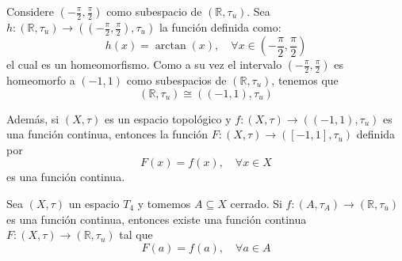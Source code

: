 \documentclass[12pt]{report}
\theoremstyle{largebreak}
\newcommand\cf[3]{\ensuremath{#1:#2\rightarrow#3}}
\begin{document}
    \begin{obs}
        Considere $\left(-\frac{\pi}{2},\frac{\pi}{2}\right)$ como subespacio de $(\mathbb{R},\tau_u)$. Sea $\cf{h}{(\mathbb{R},\tau_u)}{\left(\left(-\frac{\pi}{2},\frac{\pi}{2}\right),\tau_u\right)}$ la función definida como:
        \begin{equation*}
            h(x)=\arctan(x),\quad\forall x\in\left(-\frac{\pi}{2},\frac{\pi}{2}\right)
        \end{equation*}
        el cual es un homeomorfismo. Como a su vez el intervalo $\left(-\frac{\pi}{2},\frac{\pi}{2}\right)$ es homeomorfo a $(-1,1)$ como subespacios de $(\mathbb{R},\tau_u)$, tenemos que
        \begin{equation*}
            (\mathbb{R},\tau_u)\cong((-1,1),\tau_u)
        \end{equation*}
    \end{obs}

    \begin{obs}
        Además, si $(X,\tau)$ es un espacio topológico y $\cf{f}{(X,\tau)}{((-1,1),\tau_u)}$ es una función continua, entonces la función $\cf{F}{(X,\tau)}{([-1,1],\tau_u)}$ definida por
        \begin{equation*}
            F(x)=f(x),\quad\forall x\in X
        \end{equation*}
        es una función continua.
    \end{obs}

    \begin{propo}
        Sea $(X,\tau)$ un espacio $T_4$ y tomemos $A\subseteq X$ cerrado. Si $\cf{f}{(A,\tau_A)}{(\mathbb{R},\tau_u)}$ es una función continua, entonces existe una función continua $\cf{F}{(X,\tau)}{(\mathbb{R},\tau_u)}$ tal que
        \begin{equation*}
            F(a)=f(a),\quad\forall a\in A
        \end{equation*}
    \end{propo}
\end{document}
